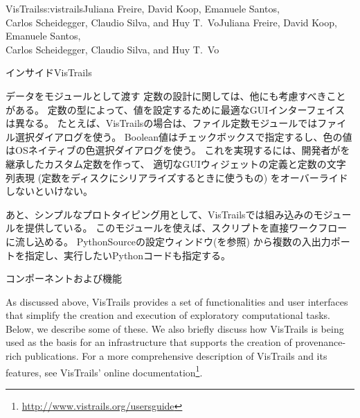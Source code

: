 \begin{aosachaptertoc}{VisTrails}{s:vistrails}{Juliana Freire, David Koop, Emanuele Santos, \\ Carlos Scheidegger, Claudio Silva, and Huy T.\ Vo}{Juliana Freire, David Koop, Emanuele Santos, \\ \hspace*{0.9cm} Carlos Scheidegger, Claudio Silva, and Huy T.\ Vo}
\begin{aosasect1}{インサイドVisTrails}
\begin{aosasect2}{データをモジュールとして渡す}
定数の設計に関しては、他にも考慮すべきことがある。
定数の型によって、値を設定するために最適なGUIインターフェイスは異なる。
たとえば、VisTrailsの場合は、ファイル定数モジュールではファイル選択ダイアログを使う。
Boolean値はチェックボックスで指定するし、色の値はOSネイティブの色選択ダイアログを使う。
これを実現するには、開発者がを継承したカスタム定数を作って、
適切なGUIウィジェットの定義と定数の文字列表現
(定数をディスクにシリアライズするときに使うもの)
をオーバーライドしないといけない。

あと、シンプルなプロトタイピング用として、VisTrailsでは組み込みのモジュールを提供している。
このモジュールを使えば、スクリプトを直接ワークフローに流し込める。
PythonSourceの設定ウィンドウ(を参照)
から複数の入出力ポートを指定し、実行したいPythonコードも指定する。

\end{aosasect2}

\end{aosasect1}

\begin{aosasect1}{コンポーネントおよび機能}

As discussed above, VisTrails provides a set of functionalities and
user interfaces that simplify the creation and execution of
exploratory computational tasks. Below, we describe some of these. We
also briefly discuss how VisTrails is being used as the basis for an
infrastructure that supports the creation of provenance-rich
publications. For a more comprehensive description of VisTrails and its features,
see VisTrails' online documentation\footnote{\url{http://www.vistrails.org/usersguide}}.


\end{aosasect1}
\end{aosachaptertoc}
